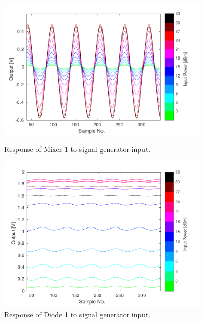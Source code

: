 \begin{figure}
  \centering
  \includegraphics[width=0.9\textwidth]{Figures/phaseMons/Mixer1_AllPowerLevels}
  \caption{Response of Mixer 1 to signal generator input.}
  \label{f:sigGenAllMix1}
  \includegraphics[width=0.9\textwidth]{Figures/phaseMons/Diode1_AllPowerLevels}
  \caption{Response of Diode 1 to signal generator input.}
  \label{f:sigGenAllDio1}
\end{figure}

